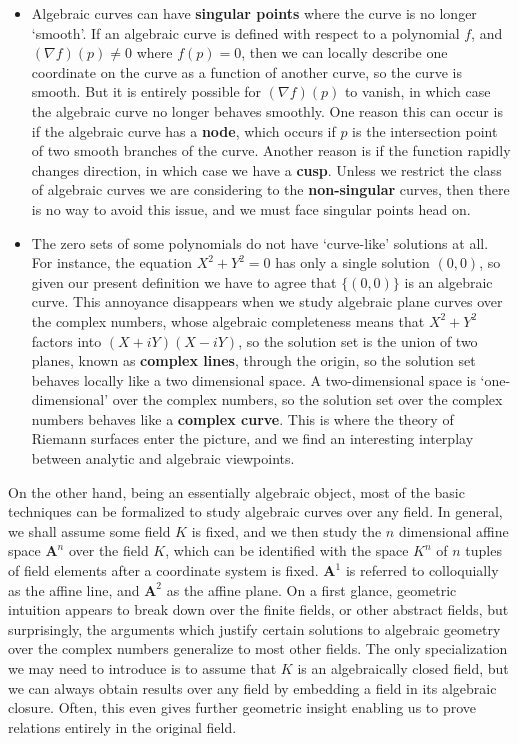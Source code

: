 \begin{itemize}
    \item Algebraic curves can have {\bf singular points} where the curve is no longer `smooth'. If an algebraic curve is defined with respect to a polynomial $f$, and $(\nabla f)(p) \neq 0$ where $f(p) = 0$, then we can locally describe one coordinate on the curve as a function of another curve, so the curve is smooth. But it is entirely possible for $(\nabla f)(p)$ to vanish, in which case the algebraic curve no longer behaves smoothly. One reason this can occur is if the algebraic curve has a {\bf node}, which occurs if $p$ is the intersection point of two smooth branches of the curve. Another reason is if the function rapidly changes direction, in which case we have a {\bf cusp}. Unless we restrict the class of algebraic curves we are considering to the {\bf non-singular} curves, then there is no way to avoid this issue, and we must face singular points head on.

    \item The zero sets of some polynomials do not have `curve-like' solutions at all. For instance, the equation $X^2 + Y^2 = 0$ has only a single solution $(0,0)$, so given our present definition we have to agree that $\{ (0,0) \}$ is an algebraic curve. This annoyance disappears when we study algebraic plane curves over the complex numbers, whose algebraic completeness means that $X^2 + Y^2$ factors into $(X + iY)(X - iY)$, so the solution set is the union of two planes, known as {\bf complex lines}, through the origin, so the solution set behaves locally like a two dimensional space. A two-dimensional space is `one-dimensional' over the complex numbers, so the solution set over the complex numbers behaves like a {\bf complex curve}. This is where the theory of Riemann surfaces enter the picture, and we find an interesting interplay between analytic and algebraic viewpoints.
\end{itemize}
%
On the other hand, being an essentially algebraic object, most of the basic techniques can be formalized to study algebraic curves over any field. In general, we shall assume some field $K$ is fixed, and we then study the $n$ dimensional affine space $\mathbf{A}^n$ over the field $K$, which can be identified with the space $K^n$ of $n$ tuples of field elements after a coordinate system is fixed. $\mathbf{A}^1$ is referred to colloquially as the affine line, and $\mathbf{A}^2$ as the affine plane. On a first glance, geometric intuition appears to break down over the finite fields, or other abstract fields, but surprisingly, the arguments which justify certain solutions to algebraic geometry over the complex numbers generalize to most other fields. The only specialization we may need to introduce is to assume that $K$ is an algebraically closed field, but we can always obtain results over any field by embedding a field in its algebraic closure. Often, this even gives further geometric insight enabling us to prove relations entirely in the original field.

